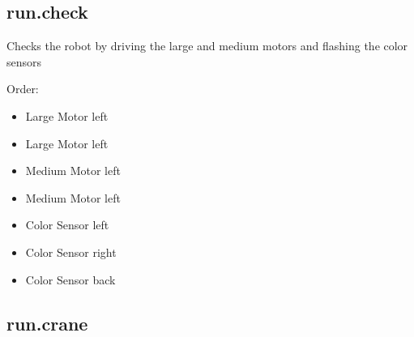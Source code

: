 \documentclass[letterpaper,10pt,english]{sphinxmanual}
\begin{document}
\subsection{run.check}
\label{\detokenize{run:module-run.check}}\label{\detokenize{run:run-check}}

\begin{fulllineitems}
\label{\detokenize{run:run.check.run_check}}
Checks the robot by driving the large and medium motors and flashing the color sensors

Order:
\begin{itemize}
\item {} 
Large Motor left

\item {} 
Large Motor left

\item {} 
Medium Motor left

\item {} 
Medium Motor left

\item {} 
Color Sensor left

\item {} 
Color Sensor right

\item {} 
Color Sensor back

\end{itemize}

\end{fulllineitems}



\subsection{run.crane}
\label{\detokenize{run:module-run.crane}}\label{\detokenize{run:run-crane}}

\begin{fulllineitems}
\label{\detokenize{run:run.crane.run_crane}}
\end{fulllineitems}
\end{document}
